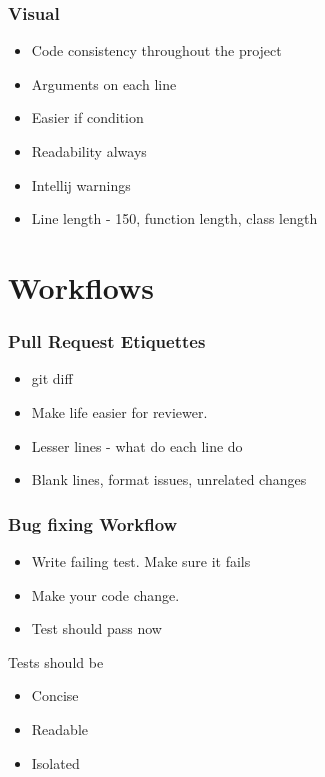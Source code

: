 \documentclass{beamer}
\begin{document}
\begin{frame}[fragile]
\frametitle{Visual}
\begin{itemize}
	\item Code consistency throughout the project
	\pause
	\item Arguments on each line
	\pause
	\item Easier if condition
	\pause
	\item Readability always
	\pause
	\item Intellij warnings
	\pause
	\item Line length - 150, function length, class length
\end{itemize}
\end{frame}

\section{Workflows}
\begin{frame}[fragile]
\frametitle{Pull Request Etiquettes}
\begin{itemize}
	\item git diff
	\pause
	\item Make life easier for reviewer.
	\pause
	\item Lesser lines - what do each line do
	\pause
	\item Blank lines, format issues, unrelated changes
\end{itemize}
\end{frame}

\begin{frame}[fragile]
\frametitle{Bug fixing Workflow}
\begin{itemize}
	\item Write failing test. Make sure it fails
	\item Make your code change.
	\item Test should pass now
\end{itemize}
\pause
Tests should be
\begin{itemize}
	\item Concise
	\item Readable
	\item Isolated
\end{itemize}
\end{frame}
\end{document}
